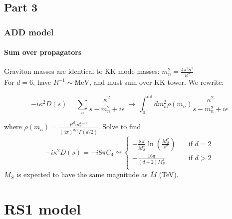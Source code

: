 \documentclass[10pt]{beamer}
\begin{document}
	\subsection{Part 3}
	\begin{frame}
		\frametitle{ADD model}
		\framesubtitle{Sum over propagators}
		Graviton masses are identical to KK mode masses: $m_n^2 = \frac{4\pi^2 n^2}{R^2}$\\
		For $d=6$, have $R^{-1} \sim \text{MeV}$, and must sum over KK tower. We rewrite:
		
		\begin{equation}
			-i\kappa^2 D(s) = \sum_{n}\frac{\kappa^2}{s-m_n^2 + i\epsilon} \:\rightarrow\: \int_0^{\inf} dm_n^2 \rho(m_n)\frac{\kappa^2}{s-m_n^2 + i\epsilon}
		\end{equation}
		
		where $\rho(m_n) = \frac{R^dm_n^{d-2}}{(4\pi)^{d/2}\Gamma(d/2)}$. Solve to find 
		\small
		\begin{equation}
		-i\kappa^2D(s) = -i8\pi C_4\simeq
		\begin{cases}
		-\frac{8\pi}{M_S^4}\ln\left(\frac{M_S^2}{s^2}\right)       & \quad \text{if } d=2\\
		-\frac{16\pi}{(d-2)M_S^4}  & \quad \text{if } d>2\\
		\end{cases}
		\end{equation}
		$M_S$ is expected to have the same magnitude as $\bar{M}$ (TeV).
		\normalsize
		
	\end{frame}
	
	\section{RS1 model}
\end{document}
